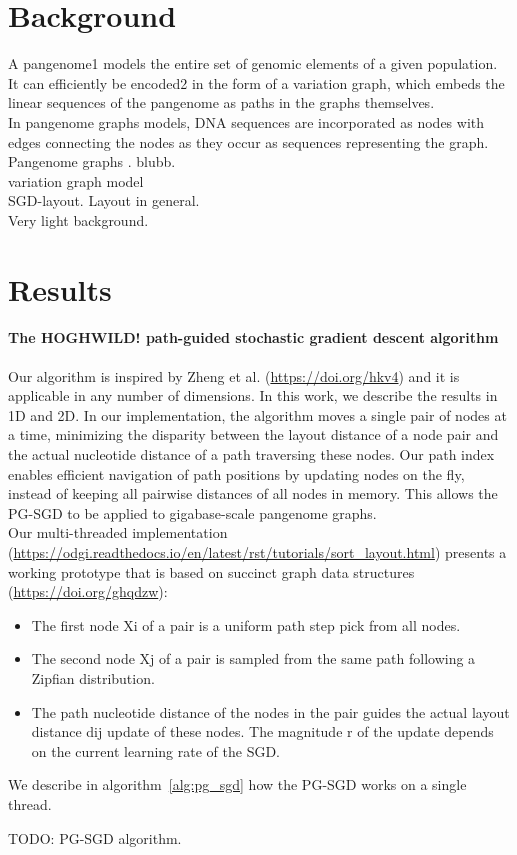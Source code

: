 \documentclass[11pt,hidelinks]{article}
\begin{document}
\section{Background}
A pangenome1 models the entire set of genomic elements of a given population. It can efficiently be encoded2 in the form of a variation graph, which embeds the linear sequences of the pangenome as paths in the graphs themselves. 
\\
In pangenome graphs models, DNA sequences are incorporated as nodes with edges connecting the nodes as they occur as sequences representing the graph.
\\
Pangenome graphs \cite{computational2016computational}. blubb.
\\
variation graph model
\\
SGD-layout. Layout in general.
\\ Very light background. 

\section{Results}

\paragraph{The HOGHWILD! path-guided stochastic gradient descent algorithm}
Our algorithm is inspired by Zheng et al. (\url{https://doi.org/hkv4}) and it is applicable in any number of dimensions.
In this work, we describe the results in 1D and 2D.
In our implementation, the algorithm moves a single pair of nodes at a time, minimizing the disparity between the layout distance of a node pair and the actual nucleotide distance of a path traversing these nodes.
Our path index enables efficient navigation of path positions by updating nodes on the fly, instead of keeping all pairwise distances of all nodes in memory.
This allows the PG-SGD to be applied to gigabase-scale pangenome graphs. \\
Our multi-threaded implementation (\url{https://odgi.readthedocs.io/en/latest/rst/tutorials/sort_layout.html}) presents a working prototype that is based on succinct graph data structures (\url{https://doi.org/ghqdzw}):
\begin{itemize}
	\item The first node Xi of a pair is a uniform path step pick from all nodes.
	\item The second node Xj of a pair is sampled from the same path following a Zipfian distribution. 
	\item The path nucleotide distance of the nodes in the pair guides the actual layout distance dij update of these nodes. The magnitude r of the update depends on the current learning rate of the SGD.
\end{itemize}
We describe in algorithm~\ref{alg:pg_sgd} how the PG-SGD works on a single thread.
\begin{algorithm}
	\caption{TODO: PG-SGD algorithm.}
	\label{alg:pg_sgd}
\end{algorithm}
\end{document}
